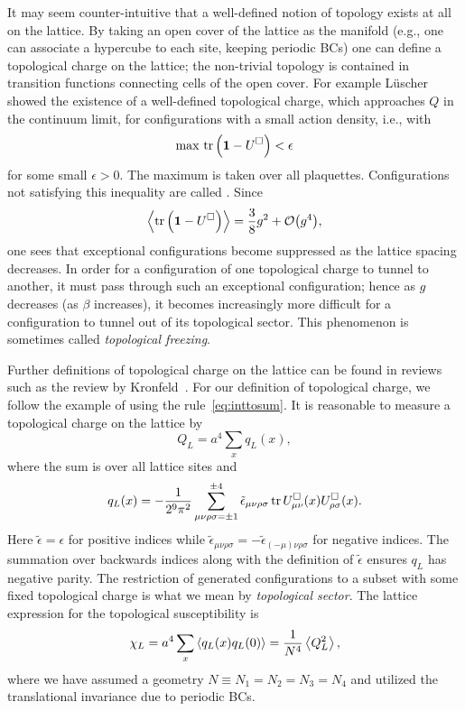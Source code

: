 It may seem counter-intuitive that a well-defined notion of topology
exists at all on the lattice. By taking an open cover of the
lattice as the manifold (e.g., one can associate a hypercube to
each site, keeping periodic BCs) one can define a topological charge on the 
lattice; the non-trivial topology is contained in transition functions
connecting cells of the open cover. For example 
L\"uscher~\cite{luscher_topology_1982} showed
the existence of a well-defined topological charge, which approaches 
$Q$ in the continuum limit, for configurations with a small action
density, i.e., with
\begin{equation}
  \max\,\tr\left({\mathbf 1}-U^\Box\right)<\epsilon
\end{equation}
for some small $\epsilon>0$. The maximum is taken over all plaquettes.
Configurations not satisfying this inequality are called 
. 
Since
\begin{equation}
  \ev{\tr\left(\id-U^\Box\right)}=\frac{3}{8}g^2+\order{g^4},
\end{equation} 
one sees that exceptional configurations become suppressed 
as the lattice spacing
decreases. In order for a configuration of one topological charge to
tunnel to another, it must pass through such an exceptional configuration;
hence as $g$ decreases (as $\beta$ increases), it becomes increasingly 
more difficult for a configuration to tunnel out of its topological sector. 
This phenomenon is sometimes called {\it topological freezing}.

Further definitions of topological charge on the lattice can be found 
in reviews such as the review by Kronfeld~\cite{kronfeld_topological_1988}.
For our definition of topological charge, we follow the example of 
 using the rule~\eqref{eq:inttosum}. It is reasonable to 
measure a topological charge on the lattice by
\begin{equation}\label{eq:QL}
  Q_L=a^4\sum_x q_L(x),
\end{equation}
where the sum is over all lattice sites and
\begin{equation}\label{eq:QLdensity}
  q_L(x) = -\frac{1}{2^9\pi^2}\sum\limits_{\mu\nu\rho\sigma=\pm 1}^{\pm 4}
         \tilde{\epsilon}_{\mu\nu\rho\sigma}
         \tr U^\Box_{\mu\nu}(x)U^\Box_{\rho\sigma}(x).
\end{equation}
Here $\tilde{\epsilon}=\epsilon$ for positive indices while
$\tilde{\epsilon}_{\mu\nu\rho\sigma}=
  -\tilde{\epsilon}_{(-\mu)\nu\rho\sigma}$ for negative indices.
The summation over backwards indices along with the definition of
$\tilde{\epsilon}$ ensures $q_L$ has negative parity.
The restriction of generated configurations to a subset with some fixed
topological charge is what we mean by 
{\it topological sector}.
The lattice expression for the topological susceptibility is
\begin{equation}
  \chi_L=a^4\sum_x\ev{q_L(x)q_L(0)}=\frac{1}{N^4}\ev{Q_L^2},
\end{equation}
where we have assumed a geometry $N\equiv N_1=N_2=N_3=N_4$
and utilized the translational invariance due to periodic BCs.


